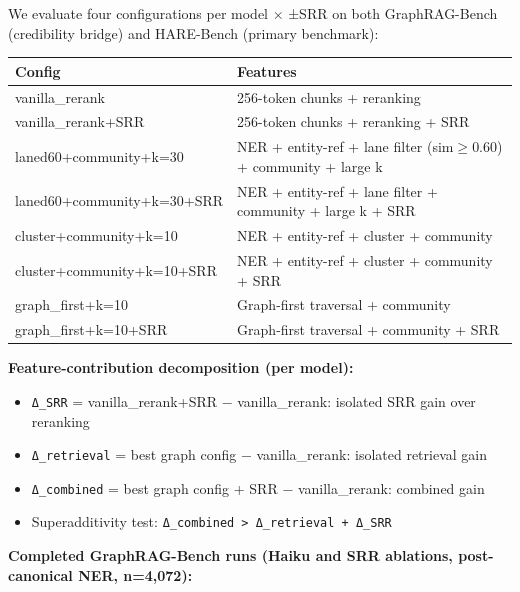 We evaluate four configurations per model × ±SRR on both GraphRAG-Bench (credibility bridge) and HARE-Bench (primary benchmark):

\begin{small}
\setlength{\tabcolsep}{4pt}
\begin{longtable}{p{2.5in}p{3.7in}}
\toprule
\textbf{Config} & \textbf{Features} \\
\midrule
\endhead
vanilla\_rerank & 256-token chunks + reranking \\
vanilla\_rerank+SRR & 256-token chunks + reranking + SRR \\
laned60+community+k=30 & NER + entity-ref + lane filter (sim$\geq$0.60) + community + large k \\
laned60+community+k=30+SRR & NER + entity-ref + lane filter + community + large k + SRR \\
cluster+community+k=10 & NER + entity-ref + cluster + community \\
cluster+community+k=10+SRR & NER + entity-ref + cluster + community + SRR \\
graph\_first+k=10 & Graph-first traversal + community \\
graph\_first+k=10+SRR & Graph-first traversal + community + SRR \\
\bottomrule
\end{longtable}
\end{small}

\textbf{Feature-contribution decomposition (per model):}

\begin{itemize}
\tightlist
\item
  \texttt{Δ\_SRR} = vanilla\_rerank+SRR − vanilla\_rerank: isolated SRR gain over reranking
\item
  \texttt{Δ\_retrieval} = best graph config − vanilla\_rerank: isolated retrieval gain
\item
  \texttt{Δ\_combined} = best graph config + SRR − vanilla\_rerank: combined gain
\item
  Superadditivity test: \texttt{Δ\_combined\ \textgreater{}\ Δ\_retrieval\ +\ Δ\_SRR}
\end{itemize}

\textbf{Completed GraphRAG-Bench runs (Haiku and SRR ablations, post-canonical NER, n=4,072):}

